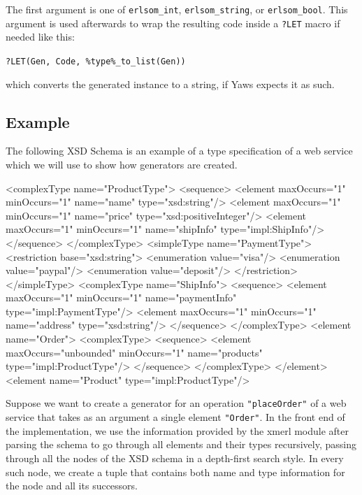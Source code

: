 \documentclass[submission,copyright]{eptcs}
\newcommand{\LET}{\texttt{?LET}\xspace}
\begin{document}
The first argument is one of \texttt{erlsom\_int},
\texttt{erlsom\_string}, or \texttt{erlsom\_bool}. This argument is
used afterwards to wrap the resulting code inside a \LET macro if
needed like this:

\begin{center}
  \texttt{?LET(Gen, Code, \%type\%\_to\_list(Gen))}
\end{center}
which converts the generated instance to a string, if Yaws expects it as such.

\subsection{Example}

The following XSD Schema is an example of a type specification of a web service 
which we will use to show how generators are created.

\begin{lstxsd}
  <complexType name="ProductType">
    <sequence>
      <element maxOccurs="1" minOccurs="1" name="name" type="xsd:string"/>
      <element maxOccurs="1" minOccurs="1" name="price" type="xsd:positiveInteger"/>
      <element maxOccurs="1" minOccurs="1" name="shipInfo" type="impl:ShipInfo"/>
    </sequence>
  </complexType>
  <simpleType name="PaymentType">
    <restriction base="xsd:string">
      <enumeration value="visa"/>
      <enumeration value="paypal"/>
      <enumeration value="deposit"/>
    </restriction>
  </simpleType>
  <complexType name="ShipInfo">
    <sequence>
      <element maxOccurs="1" minOccurs="1" name="paymentInfo" type="impl:PaymentType"/>
      <element maxOccurs="1" minOccurs="1" name="address" type="xsd:string"/>
    </sequence>
  </complexType>
  <element name="Order">
    <complexType>
      <sequence>
        <element maxOccurs="unbounded" minOccurs="1" name="products" type="impl:ProductType"/>
      </sequence>
    </complexType>
  </element>
  <element name="Product" type="impl:ProductType"/>
\end{lstxsd}


Suppose we want to create a generator for an operation
\texttt{"placeOrder"} of a web service that takes as an argument a
single element \texttt{"Order"}. In the front end of the
implementation, we use the information provided by the xmerl module
after parsing the schema to go through all elements and their types
recursively, passing through all the nodes of the XSD schema in a
depth-first search style. In every such node, we create a tuple that
contains both name and type information for the node and all its
successors.
\end{document}

